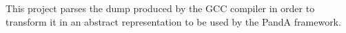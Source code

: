 This project parses the dump produced by the G\+CC compiler in order to transform it in an abstract representation to be used by the PandA framework. 